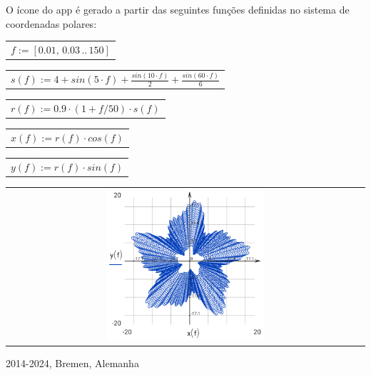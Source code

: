 \documentclass[DIV=calc, paper=a4, fontsize=11pt, twocolumn]{scrartcl}
\begin{document}
O ícone do app é gerado a partir das
seguintes funções definidas no sistema
de coordenadas polares:
\begin{center}\begin{tabular}{c}
                $f := \left[ 0.01,\, 0.03 \,..\, 150 \right]$
\end{tabular}\end{center}
\begin{center}\begin{tabular}{c}
                $s(f) := 4 + sin \left( 5 \cdot f\right)  + \frac{sin \left( 10 \cdot f\right) }{2} + \frac{sin \left( 60 \cdot f\right) }{6}$
\end{tabular}\end{center}
\begin{center}\begin{tabular}{c}
                $r(f) := 0.9 \cdot \left( 1 + f / 50 \right) \cdot s \left( f\right) $
\end{tabular}\end{center}
\begin{center}\begin{tabular}{c}
                $x(f) := r \left( f\right)  \cdot cos \left( f\right) $
\end{tabular}\end{center}
\begin{center}\begin{tabular}{c}
                $y(f) := r \left( f\right)  \cdot sin \left( f\right) $
\end{tabular}\end{center}
\begin{center}\begin{tabular}{c} \includegraphics[width=0.45\textwidth]{graphics/about_micromath_fig1.png} \end{tabular}\end{center}

2014-2024, Bremen, Alemanha
\end{document}
